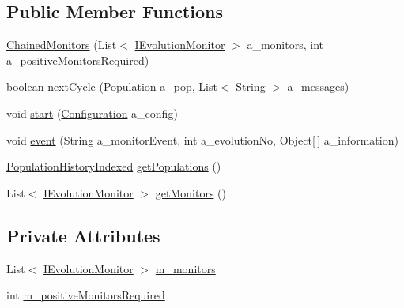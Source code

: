 \subsection*{Public Member Functions}
\begin{DoxyCompactItemize}
\item 
\hyperlink{classorg_1_1jgap_1_1audit_1_1_chained_monitors_a8d1f97e55b38f1b8a5085a87d4516add}{Chained\-Monitors} (List$<$ \hyperlink{interfaceorg_1_1jgap_1_1audit_1_1_i_evolution_monitor}{I\-Evolution\-Monitor} $>$ a\-\_\-monitors, int a\-\_\-positive\-Monitors\-Required)
\item 
boolean \hyperlink{classorg_1_1jgap_1_1audit_1_1_chained_monitors_ad2a2560cea8fb1f897b0ba347b28a5bd}{next\-Cycle} (\hyperlink{classorg_1_1jgap_1_1_population}{Population} a\-\_\-pop, List$<$ String $>$ a\-\_\-messages)
\item 
void \hyperlink{classorg_1_1jgap_1_1audit_1_1_chained_monitors_ad4fa7086f56505222c788d88a0fa7e6d}{start} (\hyperlink{classorg_1_1jgap_1_1_configuration}{Configuration} a\-\_\-config)
\item 
void \hyperlink{classorg_1_1jgap_1_1audit_1_1_chained_monitors_a8fb335d5dff7e61e0b8f73c776d507cc}{event} (String a\-\_\-monitor\-Event, int a\-\_\-evolution\-No, Object\mbox{[}$\,$\mbox{]} a\-\_\-information)
\item 
\hyperlink{classorg_1_1jgap_1_1eval_1_1_population_history_indexed}{Population\-History\-Indexed} \hyperlink{classorg_1_1jgap_1_1audit_1_1_chained_monitors_a1ff09859f60e65f12dc159230b7a1271}{get\-Populations} ()
\item 
List$<$ \hyperlink{interfaceorg_1_1jgap_1_1audit_1_1_i_evolution_monitor}{I\-Evolution\-Monitor} $>$ \hyperlink{classorg_1_1jgap_1_1audit_1_1_chained_monitors_a7eb955c722f3d0d8d2a30825a9089168}{get\-Monitors} ()
\end{DoxyCompactItemize}
\subsection*{Private Attributes}
\begin{DoxyCompactItemize}
\item 
List$<$ \hyperlink{interfaceorg_1_1jgap_1_1audit_1_1_i_evolution_monitor}{I\-Evolution\-Monitor} $>$ \hyperlink{classorg_1_1jgap_1_1audit_1_1_chained_monitors_adccb968fc8473c44367a069975c646d9}{m\-\_\-monitors}
\item 
int \hyperlink{classorg_1_1jgap_1_1audit_1_1_chained_monitors_acbdf2715020932454cc3cf90a999d0e2}{m\-\_\-positive\-Monitors\-Required}
\end{DoxyCompactItemize}
